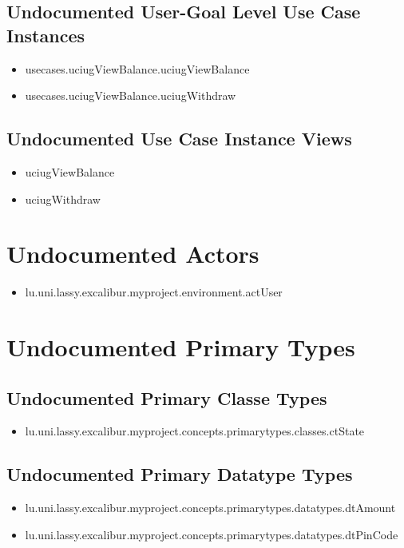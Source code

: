 \subsection[Undocumented Use Case Instances - User-Goal Level]{Undocumented User-Goal Level Use Case Instances}
\begin{itemize}
\item usecases.uciugViewBalance.uciugViewBalance 
\item usecases.uciugViewBalance.uciugWithdraw 
\end{itemize}


\subsection[Undocumented Use Case Instance Views]{Undocumented Use Case Instance Views}
\begin{itemize}
\item uciugViewBalance 
\item uciugWithdraw 
\end{itemize}


\section[Undocumented Actors]{Undocumented Actors}
\begin{itemize}
\item lu.uni.lassy.excalibur.myproject.environment.actUser 
\end{itemize}




\section[Undocumented Primary Types]{Undocumented Primary Types}

\subsection[Undocumented Primary Classe Types]{Undocumented Primary Classe Types}
\begin{itemize}
\item lu.uni.lassy.excalibur.myproject.concepts.primarytypes.classes.ctState 
\end{itemize}

\subsection[Undocumented Primary Datatype Types]{Undocumented Primary Datatype Types}
\begin{itemize}
\item lu.uni.lassy.excalibur.myproject.concepts.primarytypes.datatypes.dtAmount 
\item lu.uni.lassy.excalibur.myproject.concepts.primarytypes.datatypes.dtPinCode 
\end{itemize}

